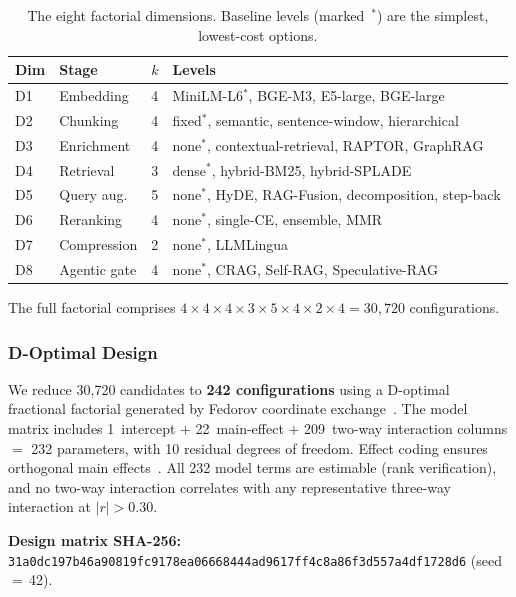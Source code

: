 \begin{table}[h]
\centering
\footnotesize
\caption{The eight factorial dimensions.  Baseline levels (marked~$^*$)
  are the simplest, lowest-cost options.}
\label{prereg:tab:dimensions}
\begin{tabular}{@{}llcl@{}}
\toprule
Dim & Stage & $k$ & Levels \\
\midrule
D1 & Embedding      & 4 & MiniLM-L6$^*$, BGE-M3, E5-large, BGE-large \\
D2 & Chunking       & 4 & fixed$^*$, semantic, sentence-window, hierarchical \\
D3 & Enrichment     & 4 & none$^*$, contextual-retrieval, RAPTOR, GraphRAG \\
D4 & Retrieval      & 3 & dense$^*$, hybrid-BM25, hybrid-SPLADE \\
D5 & Query aug.     & 5 & none$^*$, HyDE, RAG-Fusion, decomposition, step-back \\
D6 & Reranking      & 4 & none$^*$, single-CE, ensemble, MMR \\
D7 & Compression    & 2 & none$^*$, LLMLingua \\
D8 & Agentic gate   & 4 & none$^*$, CRAG, Self-RAG, Speculative-RAG \\
\bottomrule
\end{tabular}
\end{table}

The full factorial comprises
$4 \times 4 \times 4 \times 3 \times 5 \times 4 \times 2 \times 4 =
30{,}720$ configurations.

\subsubsection{D-Optimal Design}

We reduce 30{,}720 candidates to \textbf{242 configurations} using a
D-optimal fractional factorial generated by Fedorov coordinate
exchange~\citep{fedorov1972theory,atkinson2007optimum}.  The model
matrix includes 1~intercept $+$ 22~main-effect $+$ 209~two-way
interaction columns $=$ 232 parameters, with 10 residual degrees of
freedom.  Effect coding ensures orthogonal main
effects~\citep{box2005statistics,montgomery2017design}.  All 232 model
terms are estimable (rank verification), and no two-way interaction
correlates with any representative three-way interaction at
$|r| > 0.30$.

\textbf{Design matrix SHA-256:}
\texttt{31a0dc197b46a90819fc9178ea06668444ad9617ff4c8a86f3d557a4df1728d6}
(seed\,$=$\,42).

